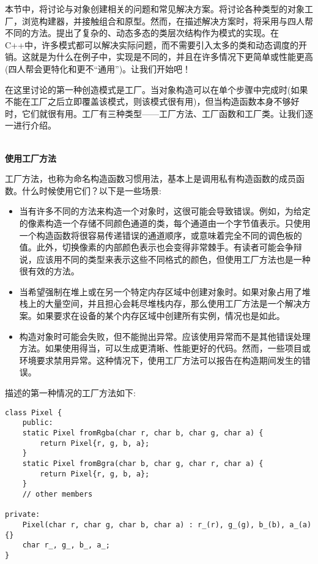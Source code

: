 
本节中，将讨论与对象创建相关的问题和常见解决方案。将讨论各种类型的对象工厂，浏览构建器，并接触组合和原型。然而，在描述解决方案时，将采用与四人帮不同的方法。提出了复杂的、动态多态的类层次结构作为模式的实现。在C++中，许多模式都可以解决实际问题，而不需要引入太多的类和动态调度的开销。这就是为什么在例子中，实现是不同的，并且在许多情况下更简单或性能更高(四人帮会更特化和更不“通用”)。让我们开始吧！


在这里讨论的第一种创造模式是工厂。当对象构造可以在单个步骤中完成时(如果不能在工厂之后立即覆盖该模式，则该模式很有用)，但当构造函数本身不够好时，它们就很有用。工厂有三种类型——工厂方法、工厂函数和工厂类。让我们逐一进行介绍。

\hspace*{\fill} \\ %
\noindent
\textbf{使用工厂方法}

工厂方法，也称为命名构造函数习惯用法，基本上是调用私有构造函数的成员函数。什么时候使用它们？以下是一些场景:

\begin{itemize}
\item 
当有许多不同的方法来构造一个对象时，这很可能会导致错误。例如，为给定的像素构造一个存储不同颜色通道的类，每个通道由一个字节值表示。只使用一个构造函数将很容易传递错误的通道顺序，或意味着完全不同的调色板的值。此外，切换像素的内部颜色表示也会变得非常棘手。有读者可能会争辩说，应该用不同的类型来表示这些不同格式的颜色，但使用工厂方法也是一种很有效的方法。

\item 
当希望强制在堆上或在另一个特定内存区域中创建对象时。如果对象占用了堆栈上的大量空间，并且担心会耗尽堆栈内存，那么使用工厂方法是一个解决方案。如果要求在设备的某个内存区域中创建所有实例，情况也是如此。

\item 
构造对象时可能会失败，但不能抛出异常。应该使用异常而不是其他错误处理方法。如果使用得当，可以生成更清晰、性能更好的代码。然而，一些项目或环境要求禁用异常。这种情况下，使用工厂方法可以报告在构造期间发生的错误。
\end{itemize}

描述的第一种情况的工厂方法如下:

\begin{lstlisting}[style=styleCXX]
class Pixel {
	public:
	static Pixel fromRgba(char r, char b, char g, char a) {
		return Pixel{r, g, b, a};
	}
	static Pixel fromBgra(char b, char g, char r, char a) {
		return Pixel{r, g, b, a};
    }
	// other members
	
private:
	Pixel(char r, char g, char b, char a) : r_(r), g_(g), b_(b), a_(a) {}
	char r_, g_, b_, a_;
}
\end{lstlisting}

